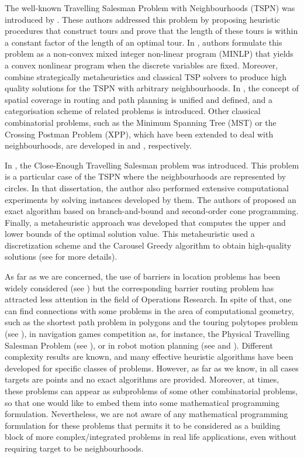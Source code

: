 \documentclass[a4paper,  review, authoryear, 1p., doubleblind]{elsarticle}
\begin{document}
	The well-known Travelling Salesman Problem with Neighbourhoods (TSPN) was introduced by \citet{arkin_approximation_1994}. These authors addressed this problem by proposing heuristic procedures that construct tours and prove that the length of these tours is within a constant factor of the length of an optimal tour. In \citet{gentilini_travelling_2013}, authors formulate this problem as a non-convex mixed integer non-linear program (MINLP) that yields a convex nonlinear program when the discrete variables are fixed. Moreover, \citet{yuan_towards_2017} combine strategically metaheuristics and classical TSP solvers to produce high quality solutions for the TSPN with arbitrary neighbourhoods. In \citet{glock_spatial_2022}, the concept of spatial coverage in routing and path planning is unified and defined, and a categorisation scheme of related problems is introduced. Other classical combinatorial problems, such as the Minimum Spanning Tree (MST) or the Crossing Postman Problem (XPP), which have been extended to deal with neighbourhoods, are developed in \citet{blanco_minimum_2017} and \citet{puerto_routing_2022}, respectively. 
	
	In \citet{mennell_heuristics_2009}, the Close-Enough Travelling Salesman problem was introduced. This problem is a particular case of the TSPN where the neighbourhoods are represented by circles. In that dissertation, the author also performed extensive computational experiments by solving instances developed by them. The authors of \citet{coutinho_branch-and-bound_2016} proposed an exact algorithm based on branch-and-bound and second-order cone programming. Finally, a metaheuristic approach was developed that computes the upper and lower bounds of the optimal solution value. This metaheuristic used a discretization scheme and the Carousel Greedy algorithm to obtain high-quality solutions (see \citet{carrabs_adaptive_2020} for more details).
	
	As far as we are concerned, the use of barriers in location problems has been widely considered (see \citet{klamroth_single-facility_2002}) but the corresponding barrier routing problem has attracted less attention in the field of Operations Research. In spite of that, one can find connections with some problems in the area of computational geometry, such as the shortest path problem in polygons and the touring polytopes problem (see \citet{mitchell_shortest_2017}), in navigation games competition as, for instance, the Physical Travelling Salesman Problem (see \citet{perez_solving_2014}), or in robot motion planning (see \citet{hwang_potential_1992} and \citet{laumond_motion_1994}).  Different complexity results are known, and many effective heuristic algorithms have been developed for specific classes of problems. However, as far as we know, in all cases targets are points and no exact algorithms are provided. Moreover, at times, these problems can appear as subproblems of some other combinatorial problems, so that one would like to embed them into some mathematical programming formulation. Nevertheless, we are not aware of any mathematical programming formulation for these problems that permits it to be considered as a building block of more complex/integrated problems in real life applications, even without requiring target to be neighbourhoods.
	
\end{document}
